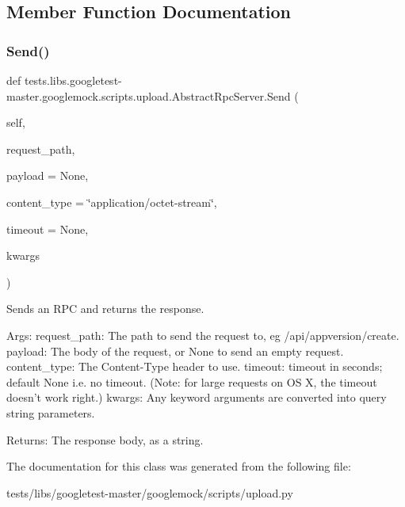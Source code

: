 \subsection{Member Function Documentation}
\mbox{\label{classtests_1_1libs_1_1googletest-master_1_1googlemock_1_1scripts_1_1upload_1_1AbstractRpcServer_a23eac5b6a27e6ec2ab41f1c59920de14}} 
\subsubsection{\texorpdfstring{Send()}{Send()}}
{\footnotesize\ttfamily def tests.\+libs.\+googletest-\/master.\+googlemock.\+scripts.\+upload.\+Abstract\+Rpc\+Server.\+Send (\begin{DoxyParamCaption}\item[{}]{self,  }\item[{}]{request\+\_\+path,  }\item[{}]{payload = {\ttfamily None},  }\item[{}]{content\+\_\+type = {\ttfamily \char`\"{}application/octet-\/stream\char`\"{}},  }\item[{}]{timeout = {\ttfamily None},  }\item[{}]{kwargs }\end{DoxyParamCaption})}

\begin{DoxyVerb}Sends an RPC and returns the response.

Args:
  request_path: The path to send the request to, eg /api/appversion/create.
  payload: The body of the request, or None to send an empty request.
  content_type: The Content-Type header to use.
  timeout: timeout in seconds; default None i.e. no timeout.
(Note: for large requests on OS X, the timeout doesn't work right.)
  kwargs: Any keyword arguments are converted into query string parameters.

Returns:
  The response body, as a string.
\end{DoxyVerb}
 

The documentation for this class was generated from the following file\+:\begin{DoxyCompactItemize}
\item 
tests/libs/googletest-\/master/googlemock/scripts/upload.\+py\end{DoxyCompactItemize}
